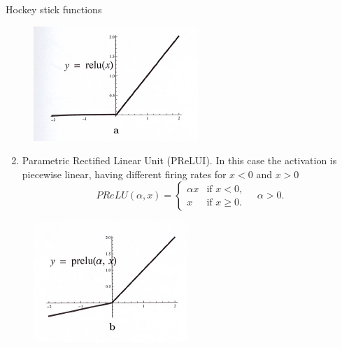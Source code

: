 \documentclass{beamer}
\begin{document}
\begin{frame}{Hockey stick functions}
	\begin{figure}[h]
		\centering
		\includegraphics[scale=0.5]{../../Figures/fig_activation_23a}
	\end{figure}
	\begin{enumerate}
				\setcounter{enumi}{1}
		\item Parametric Rectified Linear Unit (PReLUI). In this case the activation is piecewise linear, having different firing rates for $x<0$ and $x>0$
		\begin{equation*}
	PReLU(\alpha, x)=  \begin{cases}
		\alpha x & \text{if } x <0,\\
		x & \text{if } x \ge 0.
	\end{cases} \quad \alpha >0.
\end{equation*}		
	
	\end{enumerate}
	\begin{figure}[h]
	\centering
	\includegraphics[scale=0.5]{../../Figures/fig_activation_23b}
\end{figure}
\end{frame}
\end{document}
